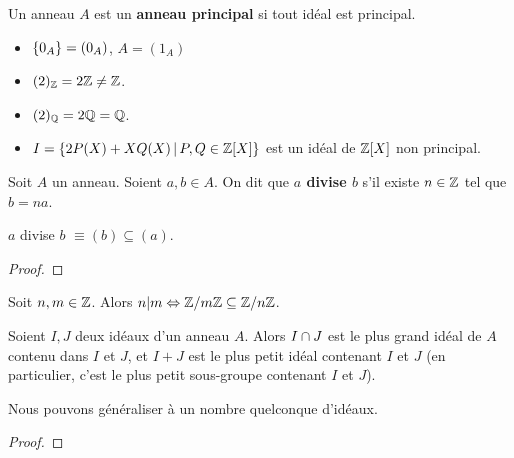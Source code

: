 \begin{definition} 
	Un anneau $A$ est un \textbf{anneau principal} si tout idéal est principal.
	\label{principal_ring}
\end{definition}

\begin{exemple}
	\begin{itemize}
		\item $\left\{ 0_{A} \right\} = (0_{A})$, $A = (1_{A})$
		\item $(2)_{\mathbb{Z}} = 2\mathbb{Z} \neq \mathbb{Z}$.
		\item $(2)_{\mathbb{Q}} = 2\mathbb{Q} = \mathbb{Q}$.
		\item $I = \left\{2 P(X) + X Q(X) \, | \, P, Q \in \mathbb{Z}[X] \right\}$ est un
			idéal de $\mathbb{Z}[X]$ non principal.
	\end{itemize}
\end{exemple}

\begin{definition}
	Soit $A$ un anneau. Soient $a, b \in A$. On dit que \textbf{$a$ divise $b$}
	s'il existe $n \in \mathbb{Z}$ tel que $b = na$.
\end{definition}

\begin{proposition}
	$a$ divise $b$ $\equiv (b) \subseteq (a)$.
\end{proposition}

\ifdefined\outputproof
\begin{proof}

\end{proof}
\fi

\begin{exemple}
	Soit $n, m \in \mathbb{Z}$. Alors $n | m \Leftrightarrow \mathbb{Z}/m\mathbb{Z} \subseteq
	\mathbb{Z}/n\mathbb{Z}$.
\end{exemple}

\begin{proposition}
	Soient $I, J$ deux idéaux d'un anneau $A$. Alors $I \cap J$ est le plus
	grand idéal de $A$ contenu dans $I$ et $J$, et $I + J$ est le plus petit
	idéal contenant $I$ et $J$ (en particulier, c'est le plus petit sous-groupe
	contenant $I$ et $J$).

	Nous pouvons généraliser à un nombre quelconque d'idéaux.
\end{proposition}

\ifdefined\outputproof
\begin{proof}

\end{proof}
\fi

